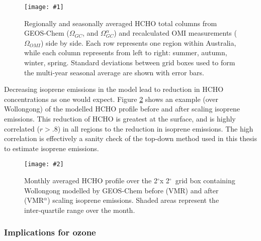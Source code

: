 \documentclass[acp, manuscript]{copernicus}
\newcommand{\degr}{$^{\circ}$}
\newcommand{\mypic}[3]{%
  \begin{figure}
    \texttt{[image: \#1]}
    \caption{#2}
    #3
  \end{figure}
}
\newcommand{\mypicw}[4]{
  \begin{figure}
    \centering
    \captionsetup{width=#1}
    \texttt{[image: \#2]}
    \caption{#3}
    #4
  \end{figure}
}
\begin{document}
      \mypic{Figures/hcho_vs_satellite.png}{%
        Regionally and seasonally averaged HCHO total columns from GEOS-Chem ($\Omega_{GC}$, and $\Omega_{GC}^{\alpha}$) and recalculated OMI measurements ($\Omega_{OMI}$) side by side.
        Each row represents one region within Australia, while each column represents from left to right: summer, autumn, winter, spring.
        Standard deviations between grid boxes used to form the multi-year seasonal average are shown with error bars.
      }{\label{BioIsop:results:emissions:fig_hcho_summary}}
      
      Decreasing isoprene emissions in the model lead to reduction in HCHO concentrations as one would expect.
      Figure \ref{BioIsop:results:emissions:fig_profile_example} shows an example (over Wollongong) of the modelled HCHO profile before and after scaling isoprene emissions.
      This reduction of HCHO is greatest at the surface, and is highly correlated ($r>.8$) in all regions to the reduction in isoprene emissions.
      The high correlation is effectively a sanity check of the top-down method used in this thesis to estimate isoprene emissions.
      
      \mypicw{0.5\textwidth}{Figures/check_GC_profile.png}{%
        Monthly averaged HCHO profile over the 2\degr x 2\degr ~grid box containing Wollongong modelled by GEOS-Chem before (VMR) and after (VMR$^{\alpha}$) scaling isoprene emissions.
        Shaded areas represent the inter-quartile range over the month.
      }{\label{BioIsop:results:emissions:fig_profile_example}}
        
  
    \subsubsection{Implications for ozone}
  
\end{document}
